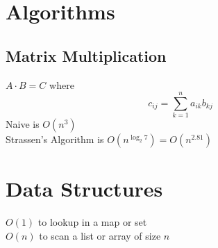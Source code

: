 \documentclass[10pt]{article}
\begin{document}
\section{Algorithms}

\subsection{Matrix Multiplication}

$A \cdot B = C$ where
$$c_{ij} = \sum_{k = 1}^n a_{ik} b_{kj}$$
Naive is $O(n^3)$ \\
Strassen's Algorithm is $O\left(n^{\log_2 7}\right) = O\left( n^{2.81}\right)$

\section{Data Structures}

$O(1)$ to lookup in a map or set \\
$O(n)$ to scan a list or array of size $n$\\
\end{document}
